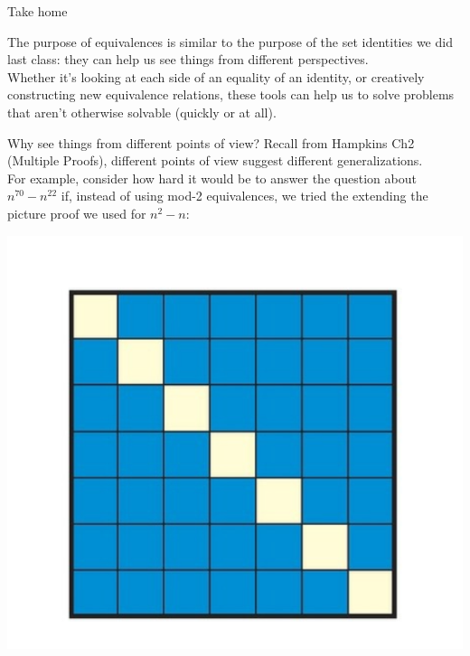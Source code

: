 \documentclass[10pt]{beamer}
\begin{document}
\begin{frame}{Take home}
\footnotesize 
\begin{myredbox}[title= The purpose of equivalences]
The purpose of equivalences is similar to the purpose of the set identities we did last class: they can help us see things from different perspectives.  \\
\vfill 
Whether it's looking at each side of an equality of an identity, or  creatively constructing  new equivalence relations, these tools can help us to solve problems that  aren't otherwise solvable (quickly or at all).
	
\end{myredbox}

\vfill \vfill 
\pause 
\begin{myyellowbox}[title= The purpose of multiple points of view]
Why see things from different points of view?  Recall from Hampkins Ch2 (Multiple Proofs), different points of view suggest different generalizations. \\
\vfill 
For example, consider how hard it would be to answer the question about $n^{70}-n^{22}$ if, instead of using mod-2 equivalences, we tried the extending the picture proof we used for $n^2-n$: 
\begin{center}
\includegraphics[width=.2\textwidth]{images/n_squared_minus_n}	
\end{center}

\end{myyellowbox}



	
\end{frame}
\end{document}
